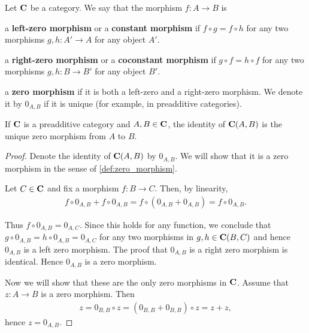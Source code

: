 \begin{definition}\label{def:zero_morphism}
  Let \( \operatorname{\mathbf{C}} \) be a category. We say that the morphism \( f: A \to B \) is
  \begin{defenum}
    \item\label{def:zero_morphism/left} a \textbf{left-zero morphism} or a \textbf{constant morphism} if \( f \circ g = f \circ h \) for any two morphisms \( g, h: A' \to A \) for any object \( A' \).
    \item\label{def:zero_morphism/right} a \textbf{right-zero morphism} or a \textbf{coconstant morphism} if \( g \circ f = h \circ f \) for any two morphisms \( g, h: B \to B' \) for any object \( B' \).
    \item\label{def:zero_morphism/bidirectional} a \textbf{zero morphism} if it is both a left-zero and a right-zero morphism. We denote it by \( 0_{A,B} \) if it is unique (for example, in preadditive categories).
  \end{defenum}
\end{definition}

\begin{proposition}\label{def:preadditive_zero_morphisms}
  If \( \operatorname{\mathbf{C}} \) is a preadditive category and \( A, B \in \operatorname{\mathbf{C}} \), the identity of \( \operatorname{\mathbf{C}}(A, B) \) is the unique zero morphism from \( A \) to \( B \).
\end{proposition}
\begin{proof}
  Denote the identity of \( \operatorname{\mathbf{C}}(A, B) \) by \( 0_{A,B} \). We will show that it is a zero morphism in the sense of \cref{def:zero_morphism}.

  Let \( C \in \operatorname{\mathbf{C}} \) and fix a morphism \( f: B \to C \). Then, by linearity,
  \begin{align*}
    f \circ 0_{A,B} + f \circ 0_{A,B}
    =
    f \circ (0_{A,B} + 0_{A,B})
    =
    f \circ 0_{A,B}.
  \end{align*}

  Thus \( f \circ 0_{A,B} = 0_{A,C} \). Since this holds for any function, we conclude that \( g \circ 0_{A,B} = h \circ 0_{A,B} = 0_{A,C} \) for any two morphisms in \( g, h \in \operatorname{\mathbf{C}}(B,C) \) and hence \( 0_{A,B} \) is a left zero morphism. The proof that \( 0_{A,B} \) is a right zero morphism is identical. Hence \( 0_{A,B} \) is a zero morphism.

  Now we will show that these are the only zero morphisms in \( \operatorname{\mathbf{C}} \). Assume that \( z: A \to B \) is a zero morphism. Then
  \begin{align*}
    z = 0_{B,B} \circ z = (0_{B,B} + 0_{B,B}) \circ z = z + z,
  \end{align*}
  hence \( z = 0_{A,B} \).
\end{proof}

